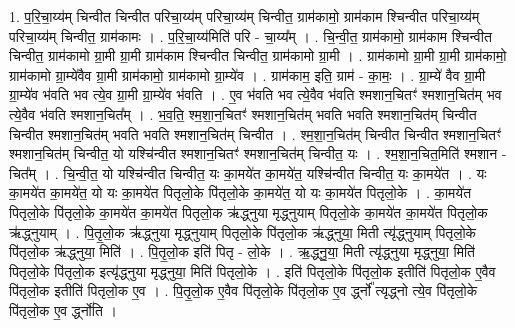 \documentclass[17pt]{extarticle}
\begin{document}
1. प॒रि॒चा॒य्य॑म् चिन्वीत चिन्वीत परिचा॒य्य॑म् परिचा॒य्य॑म् चिन्वीत॒ ग्राम॑कामो॒ ग्राम॑काम श्चिन्वीत परिचा॒य्य॑म् परिचा॒य्य॑म् चिन्वीत॒ ग्राम॑कामः । . प॒रि॒चा॒य्य॑मिति॑ परि - चा॒य्य᳚म् । . चि॒न्वी॒त॒ ग्राम॑कामो॒ ग्राम॑काम श्चिन्वीत चिन्वीत॒ ग्राम॑कामो ग्रा॒मी ग्रा॒मी ग्राम॑काम श्चिन्वीत चिन्वीत॒ ग्राम॑कामो ग्रा॒मी । . ग्राम॑कामो ग्रा॒मी ग्रा॒मी ग्राम॑कामो॒ ग्राम॑कामो ग्रा॒म्ये॑वैव ग्रा॒मी ग्राम॑कामो॒ ग्राम॑कामो ग्रा॒म्ये॑व । . ग्राम॑काम॒ इति॒ ग्राम॑ - का॒मः॒ । . ग्रा॒म्ये॑ वैव ग्रा॒मी ग्रा॒म्ये॑व भ॑वति भव त्ये॒व ग्रा॒मी ग्रा॒म्ये॑व भ॑वति । . ए॒व भ॑वति भव त्ये॒वैव भ॑वति श्मशान॒चितꣳ॑ श्मशान॒चित॑म् भव त्ये॒वैव भ॑वति श्मशान॒चित᳚म् । . भ॒व॒ति॒ श्म॒शा॒न॒चितꣳ॑ श्मशान॒चित॑म् भवति भवति श्मशान॒चित॑म् चिन्वीत चिन्वीत श्मशान॒चित॑म् भवति भवति श्मशान॒चित॑म् चिन्वीत । . श्म॒शा॒न॒चित॑म् चिन्वीत चिन्वीत श्मशान॒चितꣳ॑ श्मशान॒चित॑म् चिन्वीत॒ यो यश्चि॑न्वीत श्मशान॒चितꣳ॑ श्मशान॒चित॑म् चिन्वीत॒ यः । . श्म॒शा॒न॒चित॒मिति॑ श्मशान - चित᳚म् । . चि॒न्वी॒त॒ यो यश्चि॑न्वीत चिन्वीत॒ यः का॒मये॑त का॒मये॑त॒ यश्चि॑न्वीत चिन्वीत॒ यः का॒मये॑त । . यः का॒मये॑त का॒मये॑त॒ यो यः का॒मये॑त पितृलो॒के पि॑तृलो॒के का॒मये॑त॒ यो यः का॒मये॑त पितृलो॒के । . का॒मये॑त पितृलो॒के पि॑तृलो॒के का॒मये॑त का॒मये॑त पितृलो॒क ऋ॑द्ध्नुया मृद्ध्नुयाम् पितृलो॒के का॒मये॑त का॒मये॑त पितृलो॒क ऋ॑द्ध्नुयाम् । . पि॒तृ॒लो॒क ऋ॑द्ध्नुया मृद्ध्नुयाम् पितृलो॒के पि॑तृलो॒क ऋ॑द्ध्नुया॒ मिती त्यृ॑द्ध्नुयाम् पितृलो॒के पि॑तृलो॒क ऋ॑द्ध्नुया॒ मिति॑ । . पि॒तृ॒लो॒क इति॑ पितृ - लो॒के । . ऋ॒द्ध्नु॒या॒ मिती त्यृ॑द्ध्नुया मृद्ध्नुया॒ मिति॑ पितृलो॒के पि॑तृलो॒क इत्यृ॑द्ध्नुया मृद्ध्नुया॒ मिति॑ पितृलो॒के । . इति॑ पितृलो॒के पि॑तृलो॒क इतीति॑ पितृलो॒क ए॒वैव पि॑तृलो॒क इतीति॑ पितृलो॒क ए॒व । . पि॒तृ॒लो॒क ए॒वैव पि॑तृलो॒के पि॑तृलो॒क ए॒व र्द्ध्नो᳚ त्यृद्ध्नो त्ये॒व पि॑तृलो॒के पि॑तृलो॒क ए॒व र्द्ध्नो॑ति । \newline
\end{document}
